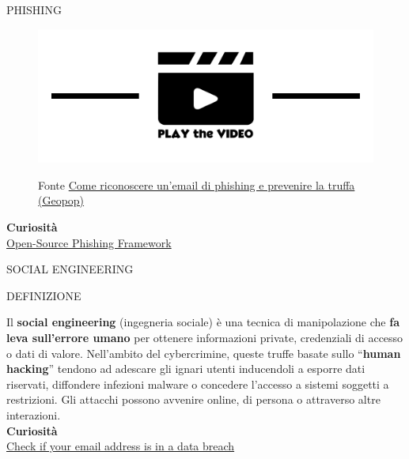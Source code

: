 \documentclass[aspectratio=1610, handout]{beamer}
\begin{document}
\begin{frame}{PHISHING}
    \begin{figure}
        \href{https://www.geopop.it/la-truffa-delle-email-cose-il-phishing-e-come-evitarlo/}{\includegraphics[width=\linewidth]{img/play.png}}
        \caption{{Fonte \href{https://www.geopop.it/la-truffa-delle-email-cose-il-phishing-e-come-evitarlo/}{Come riconoscere un’email di phishing e prevenire la truffa (Geopop)}}}
    \end{figure}   
    \bigskip
    \tiny{\textbf{Curiosità}}\\
    \tiny{\href{https://getgophish.com/}{Open-Source Phishing Framework}}      
\end{frame}

\begin{frame}{SOCIAL ENGINEERING}
    \begin{alertblock}{DEFINIZIONE}
        \begin{minipage}{0.98\linewidth}
            \justifying
            Il \textbf{social engineering} (ingegneria sociale) è una tecnica di manipolazione che \textbf{fa leva sull'errore umano} 
            per ottenere informazioni private, credenziali di accesso o dati di valore. Nell'ambito del 
            cybercrimine, queste truffe basate sullo ``\textbf{human hacking}'' tendono ad adescare gli ignari 
            utenti inducendoli a esporre dati riservati, diffondere infezioni malware o concedere l'accesso 
            a sistemi soggetti a restrizioni. Gli attacchi possono avvenire online, di persona o attraverso 
            altre interazioni.\\
            \bigskip
            \tiny{\textbf{Curiosità}}\\
            \tiny{\href{https://haveibeenpwned.com/}{Check if your email address is in a data breach}}
        \end{minipage}
    \end{alertblock}
\end{frame}
\end{document}
